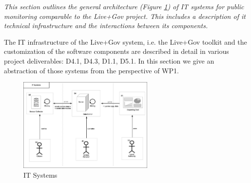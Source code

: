 \documentclass[runningheads,a4paper]{llncs}
\newenvironment{LGContent}
{ \par\color{blue} \it \small }
{ \par }
\begin{document}
\begin{LGContent}
This section outlines the general architecture (Figure \ref{figure:IT Systems}) of IT systems for public monitoring comparable to the Live+Gov project.
This includes a description of it technical infrastructure and the interactions between its components.

The IT infrastructure of the Live+Gov system, i.e. the Live+Gov toolkit and the customization of the software components are described in detail in various project deliverables: D4.1, D4.3, D1.1, D5.1.
In this section we give an abstraction of those systems from the perspective of WP1.

\begin{figure}[h]
\centering
\includegraphics[width=0.6\textwidth]{diagrams/png/it-systems.png}

%
%
%
%
%
%
%

\caption{IT Systems}
\label{figure:IT Systems}
\end{figure}


\end{LGContent}
\end{document}
